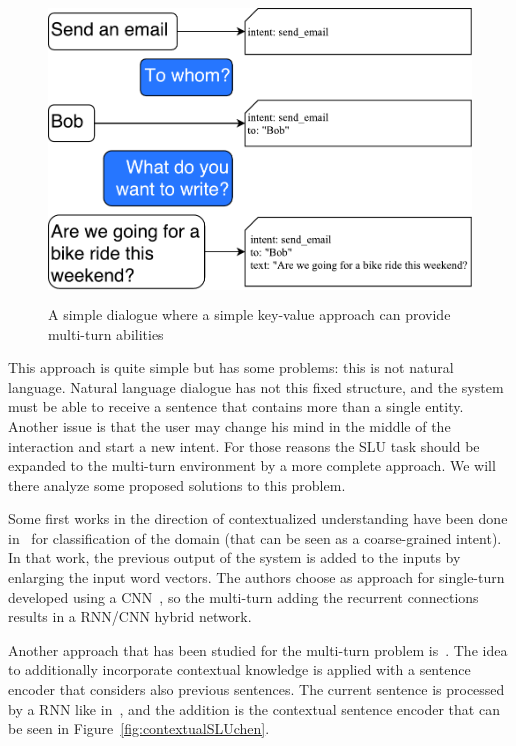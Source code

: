 
\begin{figure}[!htbp]
    \centering
    \includegraphics[max width=\linewidth,max height=8cm,keepaspectratio]{figures/multiTurnFilling}
    \caption{A simple dialogue where a simple key-value approach can provide multi-turn abilities}\label{fig:multiTurnFilling}
\end{figure}

This approach is quite simple but has some problems: this is not natural language. Natural language dialogue has not this fixed structure, and the system must be able to receive a sentence that contains more than a single entity. Another issue is that the user may change his mind in the middle of the interaction and start a new intent. For those reasons the SLU task should be expanded to the multi-turn environment by a more complete approach. We will there analyze some proposed solutions to this problem.

Some first works in the direction of contextualized understanding have been done in~\cite{xu2014contextual} for classification of the domain (that can be seen as a coarse-grained intent). In that work, the previous output of the system is added to the inputs by enlarging the input word vectors. The authors choose as approach for single-turn developed using a  CNN~\cite{krizhevsky2012imagenet}, so the multi-turn adding the recurrent connections results in a RNN/CNN hybrid network.

Another approach that has been studied for the multi-turn problem is~\cite{chen2016end}. The idea to additionally incorporate contextual knowledge is applied with a sentence encoder that considers also previous sentences. The current sentence is processed by a RNN like in~\cite{liu2016attention}, and the addition is the contextual sentence encoder that can be seen in Figure~\ref{fig:contextualSLUchen}.

